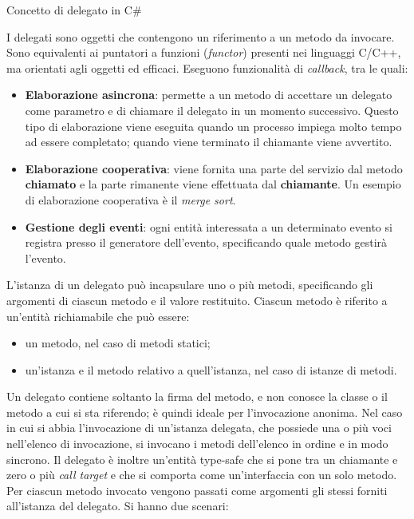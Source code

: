 \begin{problem}{1.7}
Concetto di delegato in C\#
\end{problem}
\begin{solution}
I delegati sono oggetti che contengono un riferimento a un metodo da invocare.
\newline
Sono equivalenti ai puntatori a funzioni (\textit{functor}) presenti nei linguaggi C/C++, ma orientati agli oggetti ed efficaci.
\newline
Eseguono funzionalità di \textit{callback}, tra le quali:
\begin{itemize}
	\item \textbf{Elaborazione asincrona}: permette a un metodo di accettare un delegato come parametro e di chiamare il delegato in un momento successivo. Questo tipo di elaborazione viene eseguita quando un processo impiega molto tempo ad essere completato; quando viene terminato il chiamante viene avvertito.
	\item \textbf{Elaborazione cooperativa}: viene fornita una parte del servizio dal metodo \textbf{chiamato} e la parte rimanente viene effettuata dal \textbf{chiamante}.
	\newline
	Un esempio di elaborazione cooperativa è il \textit{merge sort}.
	\item \textbf{Gestione degli eventi}: ogni entità interessata a un determinato evento si registra presso il generatore dell'evento, specificando quale metodo gestirà l'evento.
\end{itemize}
L'istanza di un delegato può incapsulare uno o più metodi, specificando gli argomenti di ciascun metodo e il valore restituito.
Ciascun metodo è riferito a un'entità richiamabile che può essere:
\begin{itemize}
	\item un metodo, nel caso di metodi statici;
	\item un'istanza e il metodo relativo a quell'istanza, nel caso di istanze di metodi.
\end{itemize}
Un delegato contiene soltanto la firma del metodo, e non conosce la classe o il metodo a cui si sta riferendo; è quindi ideale per l'invocazione anonima.
Nel caso in cui si abbia l'invocazione di un'istanza delegata, che possiede una o più voci nell'elenco di invocazione, si invocano i metodi dell'elenco in ordine e in modo sincrono.
Il delegato è inoltre un’entità type-safe che si pone tra un chiamante e zero o più \textit{call target} e che si comporta come
un’interfaccia con un solo metodo.
Per ciascun metodo invocato vengono passati come argomenti gli stessi forniti all'istanza del delegato. Si hanno due scenari:

\end{solution}

